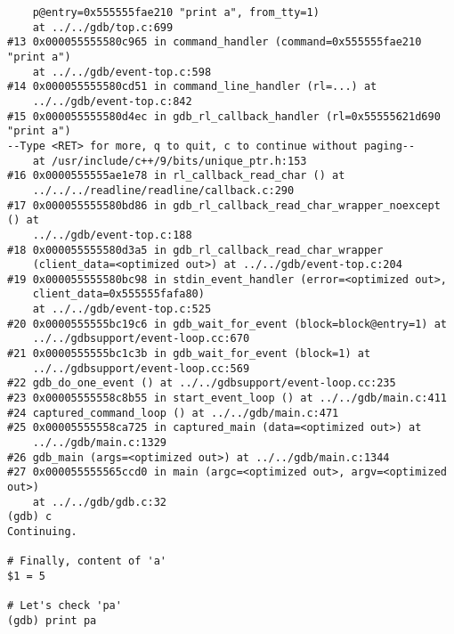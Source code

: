 \documentclass{report}
\begin{document}
\begin{verbatim}
    p@entry=0x555555fae210 "print a", from_tty=1)
    at ../../gdb/top.c:699
#13 0x000055555580c965 in command_handler (command=0x555555fae210 "print a") 
    at ../../gdb/event-top.c:598
#14 0x000055555580cd51 in command_line_handler (rl=...) at 
    ../../gdb/event-top.c:842
#15 0x000055555580d4ec in gdb_rl_callback_handler (rl=0x55555621d690 "print a")
--Type <RET> for more, q to quit, c to continue without paging--
    at /usr/include/c++/9/bits/unique_ptr.h:153
#16 0x0000555555ae1e78 in rl_callback_read_char () at 
    ../../../readline/readline/callback.c:290
#17 0x000055555580bd86 in gdb_rl_callback_read_char_wrapper_noexcept () at 
    ../../gdb/event-top.c:188
#18 0x000055555580d3a5 in gdb_rl_callback_read_char_wrapper 
    (client_data=<optimized out>) at ../../gdb/event-top.c:204
#19 0x000055555580bc98 in stdin_event_handler (error=<optimized out>, 
    client_data=0x555555fafa80)
    at ../../gdb/event-top.c:525
#20 0x0000555555bc19c6 in gdb_wait_for_event (block=block@entry=1) at 
    ../../gdbsupport/event-loop.cc:670
#21 0x0000555555bc1c3b in gdb_wait_for_event (block=1) at 
    ../../gdbsupport/event-loop.cc:569
#22 gdb_do_one_event () at ../../gdbsupport/event-loop.cc:235
#23 0x00005555558c8b55 in start_event_loop () at ../../gdb/main.c:411
#24 captured_command_loop () at ../../gdb/main.c:471
#25 0x00005555558ca725 in captured_main (data=<optimized out>) at 
    ../../gdb/main.c:1329
#26 gdb_main (args=<optimized out>) at ../../gdb/main.c:1344
#27 0x000055555565ccd0 in main (argc=<optimized out>, argv=<optimized out>) 
    at ../../gdb/gdb.c:32
(gdb) c
Continuing.

# Finally, content of 'a'
$1 = 5

# Let's check 'pa'
(gdb) print pa


\end{verbatim}
\end{document}
